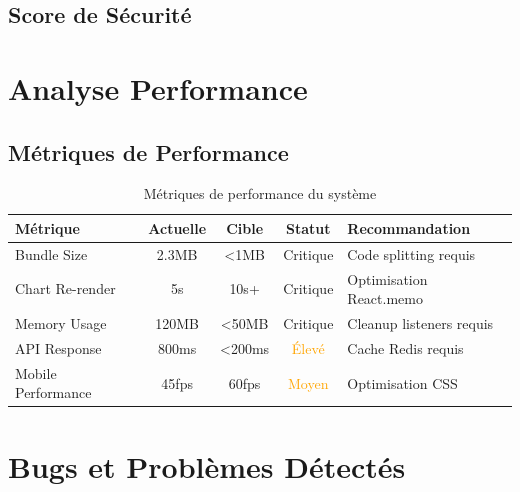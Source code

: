 \documentclass[a4paper,12pt]{article}
\begin{document}
\subsection{Score de Sécurité}

\begin{center}
\end{center}

\section{Analyse Performance}

\subsection{Métriques de Performance}

\begin{table}[h]
\centering
\begin{tabular}{|l|c|c|c|p{3cm}|}
\hline
\textbf{Métrique} & \textbf{Actuelle} & \textbf{Cible} & \textbf{Statut} & \textbf{Recommandation} \\
\hline
Bundle Size & 2.3MB & <1MB & \textcolor{alertred}{Critique} & Code splitting requis \\
\hline
Chart Re-render & 5s & 10s+ & \textcolor{alertred}{Critique} & Optimisation React.memo \\
\hline
Memory Usage & 120MB & <50MB & \textcolor{alertred}{Critique} & Cleanup listeners requis \\
\hline
API Response & 800ms & <200ms & \textcolor{orange}{Élevé} & Cache Redis requis \\
\hline
Mobile Performance & 45fps & 60fps & \textcolor{orange}{Moyen} & Optimisation CSS \\
\hline
\end{tabular}
\caption{Métriques de performance du système}
\end{table}

\section{Bugs et Problèmes Détectés}
\end{document}
